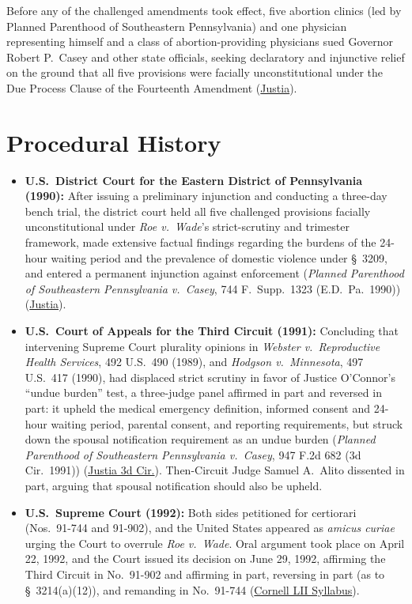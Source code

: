 \documentclass[12pt]{article}
\begin{document}
Before any of the challenged amendments took effect, five abortion clinics (led by Planned Parenthood of Southeastern Pennsylvania) and one physician representing himself and a class of abortion-providing physicians sued Governor Robert P.\ Casey and other state officials, seeking declaratory and injunctive relief on the ground that all five provisions were facially unconstitutional under the Due Process Clause of the Fourteenth Amendment (\href{https://supreme.justia.com/cases/federal/us/505/833/}{Justia}).

\section{Procedural History}

\begin{itemize}
\item \textbf{U.S.\ District Court for the Eastern District of Pennsylvania (1990):} After issuing a preliminary injunction and conducting a three-day bench trial, the district court held all five challenged provisions facially unconstitutional under \textit{Roe v.\ Wade}'s strict-scrutiny and trimester framework, made extensive factual findings regarding the burdens of the 24-hour waiting period and the prevalence of domestic violence under \S\ 3209, and entered a permanent injunction against enforcement (\textit{Planned Parenthood of Southeastern Pennsylvania v.\ Casey}, 744 F.\ Supp.\ 1323 (E.D.\ Pa.\ 1990)) (\href{https://supreme.justia.com/cases/federal/us/505/833/}{Justia}).
\item \textbf{U.S.\ Court of Appeals for the Third Circuit (1991):} Concluding that intervening Supreme Court plurality opinions in \textit{Webster v.\ Reproductive Health Services}, 492 U.S.\ 490 (1989), and \textit{Hodgson v.\ Minnesota}, 497 U.S.\ 417 (1990), had displaced strict scrutiny in favor of Justice O'Connor's ``undue burden'' test, a three-judge panel affirmed in part and reversed in part: it upheld the medical emergency definition, informed consent and 24-hour waiting period, parental consent, and reporting requirements, but struck down the spousal notification requirement as an undue burden (\textit{Planned Parenthood of Southeastern Pennsylvania v.\ Casey}, 947 F.2d 682 (3d Cir.\ 1991)) (\href{https://law.justia.com/cases/federal/appellate-courts/F2/947/682/153995/}{Justia 3d Cir.}). Then-Circuit Judge Samuel A.\ Alito dissented in part, arguing that spousal notification should also be upheld.
\item \textbf{U.S.\ Supreme Court (1992):} Both sides petitioned for certiorari (Nos.\ 91-744 and 91-902), and the United States appeared as \textit{amicus curiae} urging the Court to overrule \textit{Roe v.\ Wade}. Oral argument took place on April 22, 1992, and the Court issued its decision on June 29, 1992, affirming the Third Circuit in No.\ 91-902 and affirming in part, reversing in part (as to \S\ 3214(a)(12)), and remanding in No.\ 91-744 (\href{https://www.law.cornell.edu/supct/html/91-744.ZS.html}{Cornell LII Syllabus}).

\end{itemize}
\end{document}
